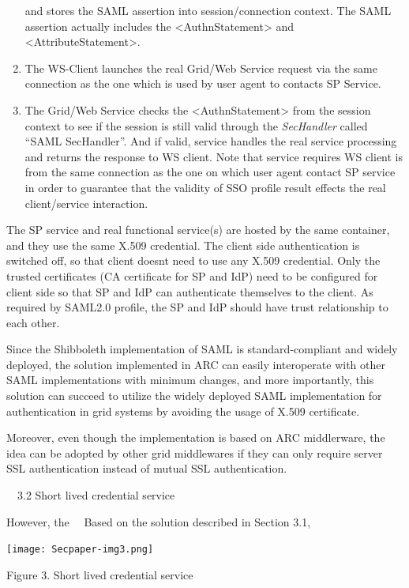 \documentclass{article}
\begin{document}
\begin{enumerate}
and stores the SAML assertion into session/connection context. The SAML
assertion actually includes the {\textless}AuthnStatement{\textgreater}
and {\textless}AttributeStatement{\textgreater}.
\item The WS-Client launches the real Grid/Web Service request via the
same connection as the one which is used by user agent to contacts SP
Service.
\item The Grid/Web Service checks the
{\textless}AuthnStatement{\textgreater} from the session context to see
if the session is still valid through the \textit{SecHandler} called
{\textquotedblleft}SAML SecHandler{\textquotedblright}. And if valid,
service handles the real service processing and returns the response to
WS client. Note that service requires WS client is from the same
connection as the one on which user agent contact SP service in order
to guarantee that the validity of SSO profile result effects the real
client/service interaction.
\end{enumerate}
The SP service and real functional service(s) are hosted by the same
container, and they use the same X.509 credential. The client side
authentication is switched off, so that client doesn{\textquotesingle}t
need to use any X.509 credential. Only the trusted certificates (CA
certificate for SP and IdP) need to be configured for client side so
that SP and IdP can authenticate themselves to the client. As required
by SAML2.0 profile, the SP and IdP should have trust relationship to
each other.

Since the Shibboleth implementation of SAML is standard-compliant and
widely deployed, the solution implemented in ARC can easily
interoperate with other SAML implementations with minimum changes, and
more importantly, this solution can succeed to utilize the widely
deployed SAML implementation for authentication in grid systems by
avoiding the usage of X.509 certificate.

Moreover, even though the implementation is based on ARC middlerware,
the idea can be adopted by other grid middlewares if they can only
require server SSL authentication instead of mutual SSL authentication.


\bigskip

\ \ 3.2 Short lived credential service

However, the \ \ Based on the solution described in Section 3.1, 


\bigskip



\begin{center}
\texttt{[image: Secpaper-img3.png]}
\end{center}
{\centering
Figure 3. Short lived credential service
\par}
\end{document}
